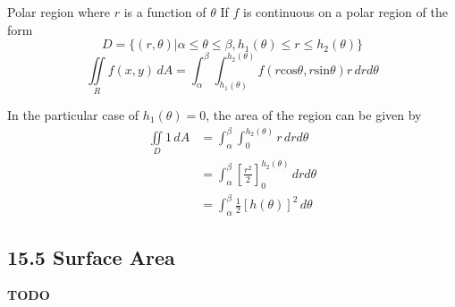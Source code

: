 \documentclass{article}
\begin{document}
	\begin{mybox}
		{Polar region where $r$ is a function of $\theta$} If $f$ is continuous on a
		polar region of the form
		\[
			D = \{(r,\theta) | \alpha \leq \theta \leq \beta, h_{1}(\theta) \leq r \leq
			h_{2}(\theta) \}
		\]
		\[
			\iint\limits_{R} f(x,y) \,dA = \int_{\alpha}^{\beta}\int_{h_1(\theta)}^{h_2(\theta)}
			f(r\text{cos}\theta, r\text{sin}\theta)r \, dr d\theta
		\]
	\end{mybox}
	In the particular case of $h_{1}(\theta) = 0$, the area of the region can be given
	by
	\begin{align*}
		\iint\limits_{D} 1 \,dA & = \int_{\alpha}^{\beta}\int_{0}^{h_2(\theta)}r \, dr d\theta                         \\
		                        & = \int_{\alpha}^{\beta}\left[ \frac{r^{2}}{2}\right]^{h_2(\theta)}_{0} \, dr d\theta \\
		                        & = \int_{\alpha}^{\beta}\frac{1}{2}\left[h(\theta)\right]^{2}\, d\theta
	\end{align*}
	\subsection{15.5 Surface Area}
	\textbf{TODO}
\end{document}
